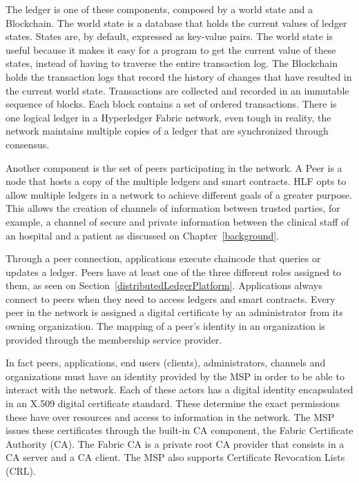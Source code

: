 The ledger is one of these components, composed by a world state and a
Blockchain. The world state is a database that holds the current values of
ledger states. States are, by default, expressed as key-value pairs. The world
state is useful because it makes it easy for a program to get the current value
of these states, instead of having to traverse the entire transaction log. The
Blockchain holds the transaction logs that record the history of changes that
have resulted in the current world state. Transactions are collected and
recorded in an immutable sequence of blocks. Each block contains a set of
ordered transactions. There is one logical ledger in a Hyperledger Fabric
network, even tough in reality, the network maintains multiple copies of a
ledger that are synchronized through consensus. 

Another component is the set of peers participating in the network. A Peer is a
node that hosts a copy of the multiple ledgers and smart contracts. HLF opts to
allow multiple ledgers in a network to achieve different goals of a greater
purpose. This allows the creation of channels of information between trusted
parties, for example, a channel of secure and private information between the
clinical staff of an hospital and a patient as discussed on
Chapter~\ref{background}. 

Through a peer connection, applications execute chaincode that queries or
updates a ledger. Peers have at least one of the three different roles assigned
to them, as seen on Section~\ref{distributedLedgerPlatform}. Applications
always connect to peers when they need to access ledgers and smart contracts.
Every peer in the network is assigned a digital certificate by an administrator
from its owning organization. The mapping of a peer's identity in an
organization is provided through the membership service provider. 

In fact peers, applications, end users (clients), administrators, channels and
organizations must have an identity provided by the MSP in order to be able to
interact with the network. Each of these actors has a digital identity
encapsulated in an X.509 digital certificate standard. These determine the
exact permissions these have over resources and access to information in the
network. The MSP issues these certificates through the built-in CA component,
the Fabric Certificate Authority (CA). The Fabric CA is a private root CA
provider that consists in a CA server and a CA client. The MSP also supports
Certificate Revocation Lists (CRL).

